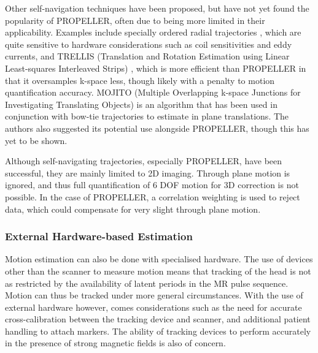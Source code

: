\documentclass[class=article, crop=false]{standalone}
\begin{document}
Other self-navigation techniques have been proposed, but have not yet found the popularity of PROPELLER, often due to being more limited in their applicability. Examples include specially ordered radial trajectories \parencite{Welch2004a,Kim2008,Anderson2011}, which are quite sensitive to hardware considerations such as coil sensitivities and eddy currents, and TRELLIS (Translation and Rotation Estimation using Linear Least-squares Interleaved Strips) \parencite{Maclaren2008}, which is more efficient than PROPELLER in that it oversamples k-space less, though likely with a penalty to motion quantification accuracy. MOJITO (Multiple Overlapping k-space Junctions for Investigating Translating Objects) \parencite{Bookwalter2010} is an algorithm that has been used in conjunction with bow-tie trajectories to estimate in plane translations. The authors also suggested its potential use alongside PROPELLER, though this has yet to be shown.
\par 
Although self-navigating trajectories, especially PROPELLER, have been successful, they are mainly limited to 2D imaging. Through plane motion is ignored, and thus full quantification of 6 DOF motion for 3D correction is not possible. In the case of PROPELLER, a correlation weighting is used to reject data, which could compensate for very slight through plane motion.

\subsubsection{External Hardware-based Estimation}
Motion estimation can also be done with specialised hardware. The use of devices other than the scanner to measure motion means that tracking of the head is not as restricted by the availability of latent periods in the MR pulse sequence. Motion can thus be tracked under more general circumstances. With the use of external hardware however, comes considerations such as the need for accurate cross-calibration between the tracking device and scanner, and additional patient handling to attach markers. The ability of tracking devices to perform accurately in the presence of strong magnetic fields is also of concern.
\end{document}

